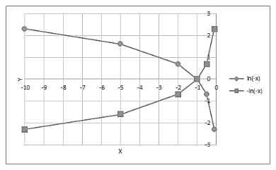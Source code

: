\begin{texemplo}
    \begin{figure}[H]
        \begin{Center}
            \includegraphics[width=4.39in,height=2.34in]{capitulos/logaritmos_e_funcao_logaritmica/media/image9.png}
        \end{Center}
    \end{figure}

\end{texemplo}

